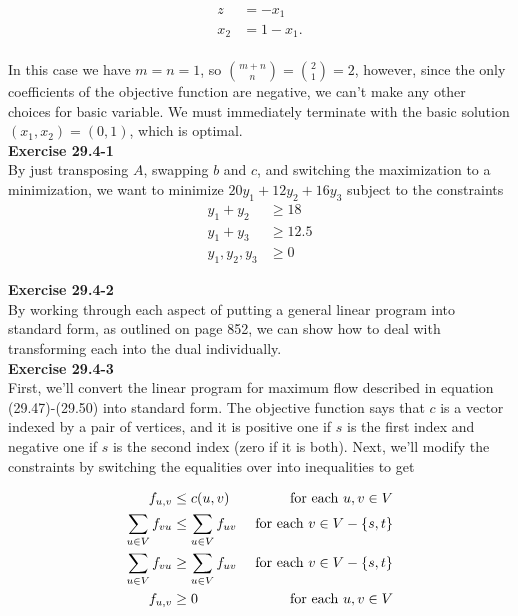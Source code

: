 \documentclass{article}
\begin{document}
\begin{align*}
z &= -x_1\\
x_2 &= 1 - x_1. \\
\end{align*}

In this case we have $m = n = 1$, so ${m+n \choose n} = {2 \choose 1} = 2$, however, since the only coefficients of the objective function are negative, we can't make any other choices for basic variable.  We must immediately terminate with the basic solution $(x_1,x_2) = (0,1)$, which is optimal. \\

\noindent\textbf{Exercise 29.4-1}\\

By just transposing $A$, swapping $b$ and $c$, and switching the maximization to a minimization, we want to minimize $20y_1 + 12 y_2 + 16 y_3$ subject to the constraints 
\begin{align*}
y_1 + y_2 &\ge 18\\
y_1 + y_3 &\ge 12.5\\
y_1,y_2,y_3 &\ge 0
\end{align*}

\noindent\textbf{Exercise 29.4-2}\\

By working through each aspect of putting a general linear program into standard form, as outlined on page 852, we can show how to deal with transforming each into the dual individually.  \\

\noindent\textbf{Exercise 29.4-3}\\


First, we'll convert the linear program for maximum flow described in equation (29.47)-(29.50) into standard form. The objective function says that $c$ is a vector indexed by a pair of vertices, and it is positive one if $s$ is the first index and negative one if $s$ is the second index (zero if it is both). Next, we'll modify the constraints by switching the equalities over into inequalities to get

\begin{align*}
f_{u,v} &\le c(u,v) &\hbox{ for each $u,v\in V$}\\
\sum_{u\in V} f_{vu} &\le \sum_{u\in V} f_{uv}  &\hbox{ for each $v\in V - \{s,t\}$}\\
\sum_{u\in V} f_{vu} &\ge \sum_{u\in V} f_{uv}  &\hbox{ for each $v\in V - \{s,t\}$}\\
f_{u,v} &\ge 0 &\hbox{ for each $u,v\in V$}\\
\end{align*}
\end{document}
